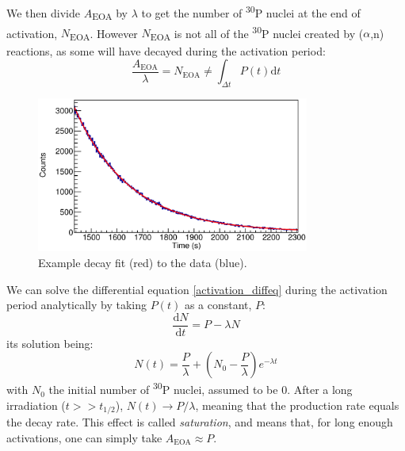 \documentclass[a4paper,12pt]{report}
\newcommand{\dif}{\text{d}}
\newcommand{\ddt}[1]{\frac{\dif #1}{\dif t}}
\newcommand{\an}{($\alpha$,n) }
\newcommand{\Piso}{\textsuperscript{30}P }
\begin{document}
We then divide $A$\textsubscript{EOA} by $\lambda$ to get the number of \Piso nuclei at the end of activation, $N$\textsubscript{EOA}.
However $N$\textsubscript{EOA} is not all of the \Piso nuclei created by \an reactions, as some will have decayed during the activation period:
\[ \frac{A_\text{EOA}}{\lambda} = N_\text{EOA} \neq \int_{\Delta t}P(t) \dif t \]

\begin{figure}[H]
	\centering
	\includegraphics[width=0.80\textwidth]{example_decay_fit.eps}
	\caption{Example decay fit (red) to the data (blue).}
	\label{example_decay_fit}
\end{figure}

We can solve the differential equation \ref{activation_diffeq} during the activation period analytically by taking $P(t)$ as a constant, $P$:
\begin{equation}
	\ddt{N} = P -\lambda N
\end{equation}
its solution being:
\begin{equation}
	N(t) = \frac{P}{\lambda} + \left(  N_0 - \frac{P}{\lambda}  \right) e^{-\lambda t}
	\label{activation_constantP_solution}
\end{equation}
with $N_0$ the initial number of \Piso nuclei, assumed to be \num{0}.
After a long irradiation ($t>>t_{1/2}$), $N(t)\longrightarrow P/\lambda$, meaning that the production rate equals the decay rate.
This effect is called \textit{saturation}, and means that, for long enough activations, one can simply take $A_\text{EOA}\approx P$.
\end{document}

